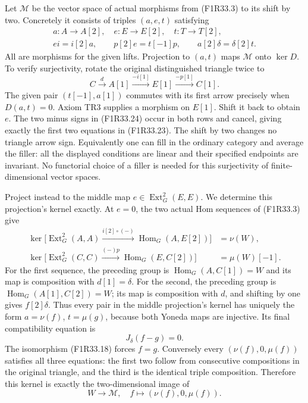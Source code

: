 Let $\mathcal M$ be the vector space
of actual morphisms from (F1R33.3)
to its shift by two. Concretely it
consists of triples $(a,e,t)$ satisfying
\[
 \begin{gathered}
 a:A\to A[2],\quad e:E\to E[2],\quad t:T\to T[2],\\
 e i=i[2]a,\qquad p[2]e=t[-1]p,
                  \qquad a[2]\delta=\delta[2]t.
 \end{gathered}
 \tag{F1R33.23}
\]
All are morphisms for the given lifts.
Projection to $(a,t)$ maps $\mathcal M$
onto $\ker D$. To verify surjectivity,
rotate the original distinguished
triangle twice to
\[
 C\xrightarrow{d}A[1]\xrightarrow{-i[1]}E[1]
                         \xrightarrow{-p[1]}C[1].
 \tag{F1R33.24}
\]
The given pair $(t[-1],a[1])$ commutes
with its first arrow precisely when
$D(a,t)=0$. Axiom TR3 supplies a
morphism on $E[1]$. Shift it back
to obtain $e$. The two minus signs
in (F1R33.24) occur in both rows
and cancel, giving exactly the first
two equations in (F1R33.23).
The shift by two changes no triangle
arrow sign. Equivalently one can
fill in the ordinary category and
average the filler: all the displayed
conditions are linear and their
specified endpoints are invariant.
No functorial choice of a filler
is needed for this surjectivity of
finite-dimensional vector spaces.

Project instead to the middle map
$e\in\operatorname{Ext}^2_G(E,E)$.
We determine this projection's kernel
exactly. At $e=0$, the two actual
Hom sequences of (F1R33.3) give
\[
 \begin{split}
 \ker\bigl[\operatorname{Ext}^2_G(A,A)
                 \xrightarrow{i[2]\circ(-)}
                        \operatorname{Hom}_G(A,E[2])\bigr]
                         &=\nu(W),\\
 \ker\bigl[\operatorname{Ext}^2_G(C,C)
                 \xrightarrow{(-)p}
                        \operatorname{Hom}_G(E,C[2])\bigr]
                         &=\mu(W)[-1].
 \end{split}
 \tag{F1R33.25}
\]
For the first sequence, the preceding
group is $\operatorname{Hom}_G(A,C[1])=W$
and its map is composition with
$d[1]=\delta$. For the second,
the preceding group is
$\operatorname{Hom}_G(A[1],C[2])=W$;
its map is composition with $d$,
and shifting by one gives $f[2]\delta$.
Thus every pair in the middle
projection's kernel has uniquely
the form $a=\nu(f)$, $t=\mu(g)$,
because both Yoneda maps are injective.
Its final compatibility equation is
\[
                         J_\delta(f-g)=0.
 \tag{F1R33.26}
\]
The isomorphism (F1R33.18) forces
$f=g$. Conversely every
$(\nu(f),0,\mu(f))$ satisfies all
three equations: the first two
follow from consecutive compositions
in the original triangle, and the
third is the identical triple
composition. Therefore this kernel
is exactly the two-dimensional
image of
\[
                 W\longrightarrow\mathcal M,
                       \quad f\longmapsto(\nu(f),0,\mu(f)).
 \tag{F1R33.27}
\]

